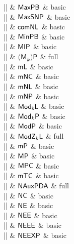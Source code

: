 |\MaxPB|    & ${\mathsf{MaxPB}}$ & basic \\

|\MaxSNP|    & ${\mathsf{MaxSNP}}$ & basic \\

|\mcoNL|    & ${\mathsf{comNL}}$ & basic \\

|\MinPB|    & ${\mathsf{MinPB}}$ & basic \\

|\MIP|    & ${\mathsf{MIP}}$ & basic \\

|\MkP|    & ${{\mathsf{(M}}_k{\mathsf{)P}}}$ & full \\

|\mL|    & ${\mathsf{mL}}$ & basic \\

|\mNC|    & ${\mathsf{mNC}}$ & basic \\

|\mNL|    & ${\mathsf{mNL}}$ & basic \\

|\mNP|    & ${\mathsf{mNP}}$ & basic \\

|\ModkL|    & ${ {\mathsf{Mod}}_{{\mathsf{k}}}{\mathsf{L}} }$ & basic \\

|\ModkP|    & ${{\mathsf{Mod}}_k{\mathsf{P}}}$ & basic \\

|\ModP|    & ${\mathsf{ModP}}$ & basic \\

|\ModZkL|    & ${{\mathsf{ModZ}}_k{\mathsf{L}}}$ & full \\

|\mP|    & ${\mathsf{mP}}$ & basic \\

|\MP|    & ${\mathsf{MP}}$ & basic \\

|\MPC|    & ${\mathsf{MPC}}$ & basic \\

|\mTC|    & ${\mathsf{mTC}}$ & basic \\

|\NAuxPDA|    & ${\mathsf{NAuxPDA}}$ & full \\

|\NC|    & ${\mathsf{NC}}$ & basic \\

|\NE|    & ${\mathsf{NE}}$ & basic \\

|\NEE|    & ${\mathsf{NEE}}$ & basic \\

|\NEEE|    & ${\mathsf{NEEE}}$ & basic \\

|\NEEXP|    & ${\mathsf{NEEXP}}$ & basic \\

